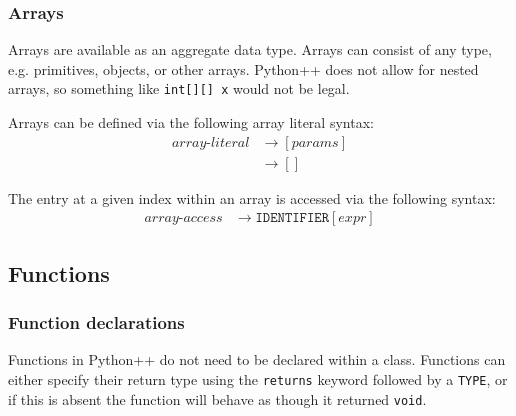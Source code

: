 \documentclass{article}
\begin{document}
\subsubsection{Arrays}
Arrays are available as an aggregate data type. Arrays can consist of any type, e.g. primitives, objects, or other arrays. Python++ does not allow for nested arrays, so something like \texttt{int[][] x} would not be legal.

Arrays can be defined via the following array literal syntax:
\label{sec:array-literal}
\begin{align*}
    \textit{array-literal} &\to [\hyperref[sec:params]{\textit{params}}] \\
    &\to []
\end{align*}

The entry at a given index within an array is accessed via the following syntax:
\label{sec:array-access}
\begin{align*}
    \textit{array-access} &\to \texttt{IDENTIFIER}[\hyperref[sec:expr]{\textit{expr}}]
\end{align*}

\subsection{Functions}
\subsubsection{Function declarations}
Functions in Python++ do not need to be declared within a class. Functions can either specify their return type using the \texttt{returns} keyword followed by a \texttt{TYPE}, or if this is absent the function will behave as though it returned \texttt{void}.
\end{document}
